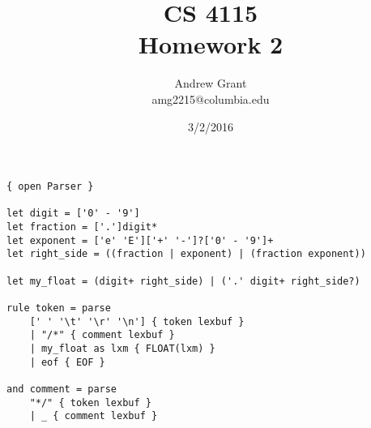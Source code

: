 \documentclass{article}
\title{CS 4115\\Homework 2}
\author{Andrew Grant\\amg2215@columbia.edu}
\date{3/2/2016}
\begin{document}
\maketitle

\section{}

\begin{lstlisting}
{ open Parser }

let digit = ['0' - '9']
let fraction = ['.']digit*
let exponent = ['e' 'E']['+' '-']?['0' - '9']+
let right_side = ((fraction | exponent) | (fraction exponent))

let my_float = (digit+ right_side) | ('.' digit+ right_side?)

rule token = parse
	[' ' '\t' '\r' '\n'] { token lexbuf }
	| "/*" { comment lexbuf }
	| my_float as lxm { FLOAT(lxm) }
	| eof { EOF }

and comment = parse 
	"*/" { token lexbuf }
	| _ { comment lexbuf }
\end{lstlisting}

\section{}
\end{document}
